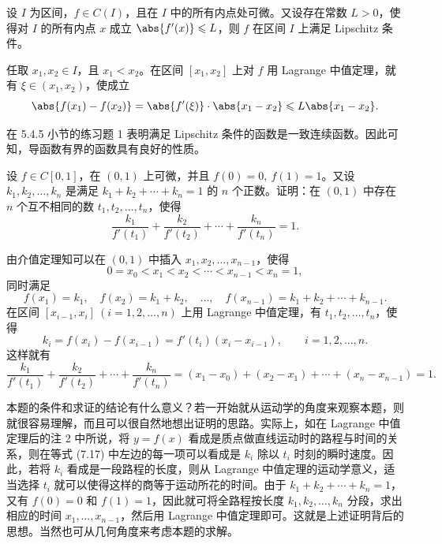 \begin{xexample}[7.1.7]
设 $I$ 为区间，$f\in C(I)$，且在 $I$ 中的所有内点处可微。又设存在常数 $L>0$，使得对 $I$ 的所有内点 $x$ 成立 $\abs{f'(x)}\leqslant L$，则 $f$ 在区间 $I$ 上满足 Lipschitz 条件。
\end{xexample}
\begin{xproof}
任取 $x_1,x_2\in I$，且 $x_1<x_2$。在区间 $[x_1,x_2]$ 上对 $f$ 用 Lagrange 中值定理，就有 $\xi\in(x_1,x_2)$，使成立
\[
  \abs{f(x_1)-f(x_2)}=\abs{f'(\xi)}\cdot\abs{x_1-x_2}\leqslant L\abs{x_1-x_2}.
\]
\end{xproof}

\begin{xremark}
在 5.4.5 小节的练习题 1 表明满足 Lipschitz 条件的函数是一致连续函数。因此可知，导函数有界的函数具有良好的性质。
\end{xremark}

\begin{xexample}[7.1.8]
设 $f\in C[0,1]$，在 $(0,1)$ 上可微，并且 $f(0)=0,\ f(1)=1$。又设 $k_1,k_2,\ldots,k_n$ 是满足 $k_1+k_2+\cdots+k_n=1$ 的 $n$ 个正数。证明：在 $(0,1)$ 中存在 $n$ 个互不相同的数 $t_1,t_2,\ldots,t_n$，使得
\begin{equation}
  \frac{k_1}{f'(t_1)}+\frac{k_2}{f'(t_2)}+\cdots+\frac{k_n}{f'(t_n)}=1.
  \tag{7.17}
\end{equation}
\end{xexample}
\begin{xproof}
由介值定理知可以在 $(0,1)$ 中插入 $x_1,x_2,\ldots,x_{n-1}$，使得
\[
  0=x_0<x_1<x_2<\cdots<x_{n-1}<x_n=1,
\]
同时满足
\[
  f(x_1)=k_1,\quad f(x_2)=k_1+k_2,\quad\ldots,\quad f(x_{n-1})=k_1+k_2+\cdots+k_{n-1}.
\]
在区间 $[x_{i-1},x_i]\ (i=1,2,\ldots,n)$ 上用 Lagrange 中值定理，有 $t_1,t_2,\ldots,t_n$，使得
\[
  k_i=f(x_i)-f(x_{i-1})=f'(t_i)(x_i-x_{i-1}),\qquad i=1,2,\ldots,n.
\]
这样就有
\[
  \frac{k_1}{f'(t_1)}+\frac{k_2}{f'(t_2)}+\cdots+\frac{k_n}{f'(t_n)}
  =(x_1-x_0)+(x_2-x_1)+\cdots+(x_n-x_{n-1})=1.
\]
\end{xproof}

\begin{xremark}
本题的条件和求证的结论有什么意义？若一开始就从运动学的角度来观察本题，则就很容易理解，而且可以很自然地想出证明的思路。实际上，如在 Lagrange 中值定理后的注 2 中所说，将 $y=f(x)$ 看成是质点做直线运动时的路程与时间的关系，则在等式 (7.17) 中左边的每一项可以看成是 $k_i$ 除以 $t_i$ 时刻的瞬时速度。因此，若将 $k_i$ 看成是一段路程的长度，则从 Lagrange 中值定理的运动学意义，适当选择 $t_i$ 就可以使得这样的商等于运动所花的时间。由于 $k_1+k_2+\cdots+k_n=1$，又有 $f(0)=0$ 和 $f(1)=1$，因此就可将全路程按长度 $k_1,k_2,\ldots,k_n$ 分段，求出相应的时间 $x_1,\ldots,x_{n-1}$，然后用 Lagrange 中值定理即可。这就是上述证明背后的思想。当然也可从几何角度来考虑本题的求解。
\end{xremark}

